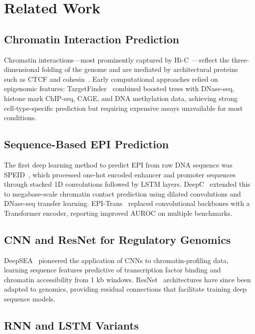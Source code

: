 \section{Related Work}
\label{sec:related}

\subsection{Chromatin Interaction Prediction}

Chromatin interactions---most prominently captured by Hi-C~\cite{hic}---reflect the
three-dimensional folding of the genome and are mediated by architectural proteins
such as CTCF and cohesin~\cite{ctcf}.
Early computational approaches relied on epigenomic features: TargetFinder~\cite{targetfinder}
combined boosted trees with DNase-seq, histone mark ChIP-seq, CAGE, and DNA methylation
data, achieving strong cell-type-specific prediction but requiring expensive assays
unavailable for most conditions.

\subsection{Sequence-Based EPI Prediction}

The first deep learning method to predict EPI from raw DNA sequence was
SPEID~\cite{speid}, which processed one-hot encoded enhancer and promoter sequences
through stacked 1D convolutions followed by LSTM layers.
DeepC~\cite{deepc} extended this to megabase-scale chromatin contact prediction using
dilated convolutions and DNase-seq transfer learning.
EPI-Trans~\cite{epitrans} replaced convolutional backbones with a Transformer encoder,
reporting improved AUROC on multiple benchmarks.

\subsection{CNN and ResNet for Regulatory Genomics}

DeepSEA~\cite{deepsea} pioneered the application of CNNs to chromatin-profiling data,
learning sequence features predictive of transcription factor binding and chromatin
accessibility from 1 kb windows.
ResNet~\cite{resnet} architectures have since been adapted to genomics, providing residual
connections that facilitate training deep sequence models.

\subsection{RNN and LSTM Variants}

